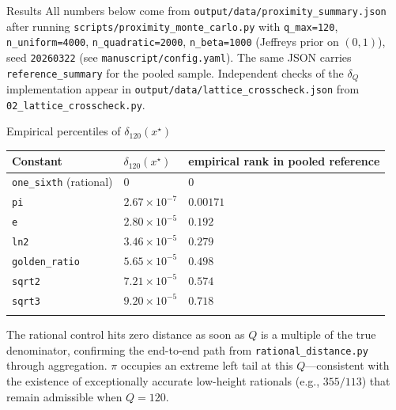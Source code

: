 \documentclass[
  ignorenonframetext,
]{beamer}
\author{\texorpdfstring{}{}}
\date{}
\newcounter{none} %
\begin{document}
\begin{frame}[fragile]{Results}
\protect{}\label{results}
All numbers below come from \texttt{output/data/proximity\_summary.json}
after running \texttt{scripts/proximity\_monte\_carlo.py} with
\texttt{q\_max=120}, \texttt{n\_uniform=4000},
\texttt{n\_quadratic=2000}, \texttt{n\_beta=1000} (Jeffreys prior on
\((0,1)\)), seed \texttt{20260322} (see
\texttt{manuscript/config.yaml}). The same JSON carries
\texttt{reference\_summary} for the pooled sample. Independent checks of
the \(\delta_Q\) implementation appear in
\texttt{output/data/lattice\_crosscheck.json} from
\texttt{02\_lattice\_crosscheck.py}.

\begin{block}{Empirical percentiles of \(\delta_{120}(x^\star)\)}
\protect{}\label{empirical-percentiles-of-delta_120xstar}
{\def\LTcaptype{none} %
\begin{longtable}[]{@{}
  >{\raggedright\arraybackslash}p{}
  >{\raggedright\arraybackslash}p{}
  >{\raggedright\arraybackslash}p{}@{}}
\toprule\noalign{}
\begin{minipage}[b]{\linewidth}\raggedright
Constant
\end{minipage} & \begin{minipage}[b]{\linewidth}\raggedright
\(\delta_{120}(x^\star)\)
\end{minipage} & \begin{minipage}[b]{\linewidth}\raggedright
empirical rank in pooled reference
\end{minipage} \\
\midrule\noalign{}
\endhead
\texttt{one\_sixth} (rational) & \(0\) & \(0\) \\
\texttt{pi} & \(2.67\times 10^{-7}\) & \(0.00171\) \\
\texttt{e} & \(2.80\times 10^{-5}\) & \(0.192\) \\
\texttt{ln2} & \(3.46\times 10^{-5}\) & \(0.279\) \\
\texttt{golden\_ratio} & \(5.65\times 10^{-5}\) & \(0.498\) \\
\texttt{sqrt2} & \(7.21\times 10^{-5}\) & \(0.574\) \\
\texttt{sqrt3} & \(9.20\times 10^{-5}\) & \(0.718\) \\
\bottomrule\noalign{}
\end{longtable}
}

The rational control hits zero distance as soon as \(Q\) is a multiple
of the true denominator, confirming the end-to-end path from
\texttt{rational\_distance.py} through aggregation. \(\pi\) occupies an
extreme left tail at this \(Q\)---consistent with the existence of
exceptionally accurate low-height rationals (e.g., \(355/113\)) that
remain admissible when \(Q=120\).
\end{block}


\end{frame}
\end{document}
